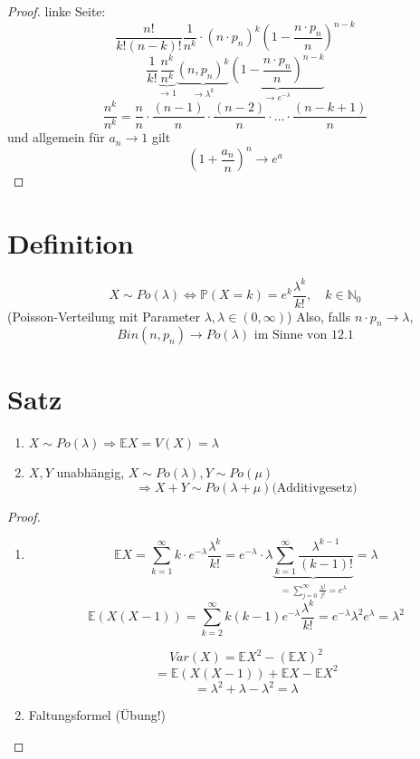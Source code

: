 \documentclass[a4paper,11pt,notitlepage]{report}
\newcommand{\N}{{\ensuremath{\mathbb{N}}}}
\newcommand{\Prim}{{\ensuremath{\mathbb{P}}}}
\newcommand{\E}{{\ensuremath{\mathbb{E}}}}
\begin{document}
\begin{proof}
	linke Seite:
	$$\frac{n!}{k!(n-k)!} \frac{1}{n^k} \cdot (n \cdot p_n)^k (1- \frac{n \cdot p_n}{n})^{n-k}$$
	$$\frac{1}{k!} \underbrace{\frac{n^k}{n^k}}_{\rightarrow 1} \underbrace{(n, p_n)^k}_{\rightarrow \lambda^k} \underbrace{(1- \frac{n \cdot p_n}{n})^{n-k}}_{\rightarrow e^{- \lambda}}$$
	$$\frac{n^k}{n^k} = \frac{n}{n} \cdot \frac{(n-1)}{n} \cdot \frac{(n-2)}{n} \cdot \ldots \cdot \frac{(n-k+1)}{n}$$
	und allgemein für $a_n \rightarrow 1$ gilt
	$$(1 + \frac{a_n}{n})^n \rightarrow e^a$$
\end{proof}

\section{Definition}
$$X \sim Po(\lambda) \Leftrightarrow \Prim(X=k)= e^k \frac{\lambda^k}{k!}, \quad k \in \N_0$$
(Poisson-Verteilung mit Parameter $\lambda, \lambda \in (0, \infty)$)
Also, falls $n \cdot p_n \rightarrow \lambda,$
$$Bin(n,p_n) \rightarrow Po(\lambda) \text{ im Sinne von 12.1}$$

\section{Satz}
\begin{enumerate}
	\item $X \sim Po(\lambda) \Rightarrow \E X = V(X) = \lambda$
	\item $X,Y$ unabhängig, $X \sim Po(\lambda), Y \sim Po(\mu)$
		$$\Rightarrow X+Y \sim Po(\lambda + \mu) \text{(Additivgesetz)}$$
\end{enumerate}

\begin{proof}
	\begin{enumerate}
		\item $$\E X = \sum\limits_{k=1}^\infty {k \cdot e^{- \lambda} \frac{\lambda^k}{k!}} = e^{-\lambda} \cdot \lambda \underbrace{\sum\limits_{k=1}^\infty{\frac{\lambda^{k-1}}{(k-1)!}}}_{= \sum\limits_{j=0}^\infty{\frac{\lambda^{j}}{j!}} = e^\lambda} = \lambda$$
		$$\E (X (X-1)) = \sum\limits_{k=2}^\infty{k(k-1)e^{-\lambda} \frac{\lambda^k}{k!}} = e^{-\lambda} \lambda^2 e^\lambda = \lambda^2$$
		
		$$Var(X) = \E X^2 - (\E X)^2$$
		$$= \E(X (X-1)) + \E X - \E X^2$$
		$$= \lambda^2 + \lambda - \lambda^2 = \lambda$$
		\item Faltungsformel (Übung!)
	\end{enumerate}
\end{proof}
\end{document}
